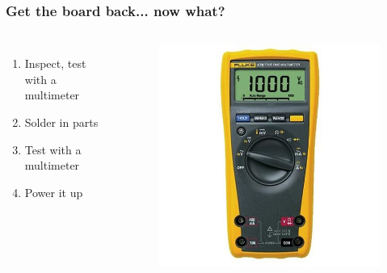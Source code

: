 \documentclass{beamer}
\begin{document}
\begin{frame}
\frametitle{Get the board back... now what?}
\begin{columns}[c] %

\begin{enumerate}
\item Inspect, test with a multimeter
\item Solder in parts
\item Test with a multimeter
\item Power it up
\end{enumerate}

\begin{figure}
\includegraphics[width=0.8\linewidth]{fluke.jpg}
\end{figure}

\end{columns}
\end{frame}

\end{document}
